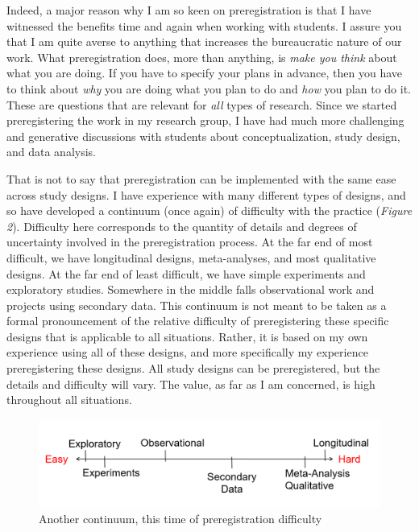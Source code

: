 \documentclass[authordate, empirical,issue]{jote-new-article}
\begin{document}
Indeed, a major reason why I am so keen on preregistration is that I have witnessed the benefits time and again when working with students. I assure you that I am quite averse to anything that increases the bureaucratic nature of our work. What preregistration does, more than anything, is \emph{make you think} about what you are doing. If you have to specify your plans in advance, then you have to think about \emph{why} you are doing what you plan to do and \emph{how} you plan to do it. These are questions that are relevant for \emph{all} types of research. Since we started preregistering the work in my research group, I have had much more challenging and generative discussions with students about conceptualization, study design, and data analysis.







That is not to say that preregistration can be implemented with the same ease across study designs. I have experience with many different types of designs, and so have developed a continuum (once again) of difficulty with the practice (\emph{Figure 2}). Difficulty here corresponds to the quantity of details and degrees of uncertainty involved in the preregistration process. At the far end of most difficult, we have longitudinal designs, meta-analyses, and most qualitative designs. At the far end of least difficult, we have simple experiments and exploratory studies. Somewhere in the middle falls observational work and projects using secondary data. This continuum is not meant to be taken as a formal pronouncement of the relative difficulty of preregistering these specific designs that is applicable to all situations. Rather, it is based on my own experience using all of these designs, and more specifically my experience preregistering these designs. All study designs can be preregistered, but the details and difficulty will vary. The value, as far as I am concerned, is high throughout all situations.



\begin{figure}
  \begin{fullwidth}
    \includegraphics[width=\linewidth]{media/image2.png}

    \caption{Another continuum, this time of preregistration difficulty}

    \label{fig:rId15}

  \end{fullwidth}
\end{figure}
\end{document}
